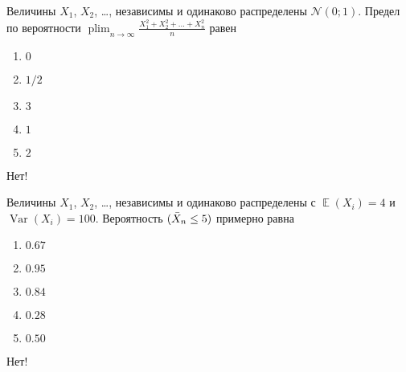 \documentclass[t]{beamer}
\DeclareMathOperator*\plim{plim}
\DeclareMathOperator{\Var}{Var}
\DeclareMathOperator{\E}{\mathbb{E}}
\let\P\relax
\DeclareMathOperator{\P}{\mathbb{P}}
\newcommand{\cN}{\mathcal{N}}
\begin{document}
 \begin{frame} \label{35-No} 
\begin{block}{35} 

Величины $X_1$, $X_2$, \ldots, независимы и одинаково распределены $\cN(0;1)$. Предел по вероятности $\plim_{n\to\infty} \frac{X_1^2+ X_2^2 + \ldots + X_n^2}{n}$ равен
 


 \end{block} 
\begin{enumerate} 
\item[] \hyperlink{35-No}{\beamergotobutton{} $0$}
\item[] \hyperlink{35-No}{\beamergotobutton{} $1/2$}
\item[] \hyperlink{35-No}{\beamergotobutton{} $3$}
\item[] \hyperlink{35-Yes}{\beamergotobutton{} $1$}
\item[] \hyperlink{35-No}{\beamergotobutton{} $2$}
\end{enumerate} 

 \alert{Нет!} 
\end{frame} 


 \begin{frame} \label{36-No} 
\begin{block}{36} 

Величины $X_1$, $X_2$, \ldots, независимы и одинаково распределены с $\E(X_i) = 4$ и $\Var(X_i) = 100$. Вероятность $\P(\bar X_n \leq 5)$ примерно равна
  


 \end{block} 
\begin{enumerate} 
\item[] \hyperlink{36-No}{\beamergotobutton{}  $0.67$ }
\item[] \hyperlink{36-No}{\beamergotobutton{}  $0.95$ }
\item[] \hyperlink{36-Yes}{\beamergotobutton{}  $0.84$ }
\item[] \hyperlink{36-No}{\beamergotobutton{}  $0.28$ }
\item[] \hyperlink{36-No}{\beamergotobutton{}  $0.50$ }
\end{enumerate} 

 \alert{Нет!} 
\end{frame} 
\end{document}
